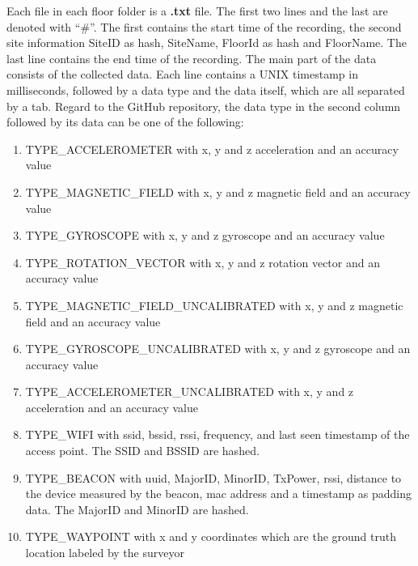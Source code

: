 Each file in each floor folder is a \textbf{.txt} file. 
The first two lines and the last are denoted with ``\#''.
The first contains the start time of the recording, the second site information SiteID as hash, SiteName, FloorId as hash and FloorName.
The last line contains the end time of the recording.
The main part of the data consists of the collected data. 
Each line contains a UNIX timestamp in milliseconds, followed by a data type and the data itself, which are all separated by a tab.
Regard to the GitHub repository\cite{GitHubComp}, the data type in the second column followed by its data can be one of the following:

\begin{enumerate}
    \item\label{type:acce} TYPE\_ACCELEROMETER with x, y and z acceleration and an accuracy value
    \item\label{type:mag} TYPE\_MAGNETIC\_FIELD with x, y and z magnetic field and an accuracy value
    \item\label{type:gyro} TYPE\_GYROSCOPE with x, y and z gyroscope and an accuracy value
    \item\label{type:rot} TYPE\_ROTATION\_VECTOR with x, y and z rotation vector and an accuracy value
    \item\label{type:mag_u} TYPE\_MAGNETIC\_FIELD\_UNCALIBRATED with x, y and z magnetic field and an accuracy value
    \item\label{type:gyro_u} TYPE\_GYROSCOPE\_UNCALIBRATED with x, y and z gyroscope and an accuracy value
    \item\label{type:acce_u} TYPE\_ACCELEROMETER\_UNCALIBRATED with x, y and z acceleration and an accuracy value
    \item\label{type:wifi} TYPE\_WIFI with \ac{ssid}, \ac{bssid}, \ac{rssi}, frequency, and last seen timestamp of the access point. The SSID and BSSID are hashed.
    \item\label{type:beacon} TYPE\_BEACON with \ac{uuid}, \ac{MajorID}, \ac{MinorID}, \ac{TxPower}, \ac{rssi}, distance to the device measured by the beacon, \ac{mac} address and a timestamp as padding data. The MajorID and MinorID are hashed.
    \item\label{type:way} TYPE\_WAYPOINT with x and y coordinates which are the ground truth location labeled by the surveyor
\end{enumerate}


